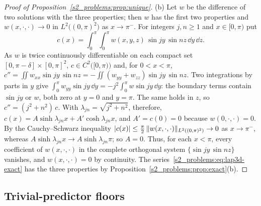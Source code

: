 \begin{proof}[Proof of Proposition~\ref{s2_problems:prop:unique}]
(b) Let $w$ be the difference of two solutions with the three properties; then $w$ has the
first two properties and $w(x,\cdot,\cdot)\to0$ in $L^2\bigl((0,\pi)^2\bigr)$ as
$x\to\pi^-$. For integers $j,n\ge1$ and $x\in[0,\pi)$ put
\[
c(x)=\int_0^\pi\!\!\int_0^\pi w(x,y,z)\,\sin jy\,\sin nz\,\dd y\,\dd z .
\]
As $w$ is twice continuously differentiable on each compact set
$[0,\pi-\delta]\times[0,\pi]^2$, $c\in C^2\bigl([0,\pi)\bigr)$ and, for $0<x<\pi$,
$c''=\iint w_{xx}\sin jy\,\sin nz=-\iint(w_{yy}+w_{zz})\sin jy\,\sin nz$. Two integrations
by parts in $y$ give
$\int_0^\pi w_{yy}\sin jy\,\dd y=-j^2\int_0^\pi w\sin jy\,\dd y$: the boundary terms
contain $\sin jy$ or $w$, both zero at $y=0$ and $y=\pi$. The same holds in $z$, so
$c''=(j^2+n^2)\,c$. With $\lambda_{jn}=\sqrt{j^2+n^2}$, therefore,
$c(x)=A\sinh\lambda_{jn}x+A'\cosh\lambda_{jn}x$, and $A'=c(0)=0$ because $w(0,\cdot,\cdot)=0$. By the
Cauchy--Schwarz inequality
$\lvert c(x)\rvert\le\tfrac\pi2\,\lVert w(x,\cdot,\cdot)\rVert_{L^2((0,\pi)^2)}\to0$ as $x\to\pi^-$,
whereas $A\sinh\lambda_{jn}x\to A\sinh\lambda_{jn}\pi$; so $A=0$. Thus, for each $x<\pi$, every
coefficient of $w(x,\cdot,\cdot)$ in the complete orthogonal system $\{\sin jy\,\sin nz\}$
vanishes, and $w(x,\cdot,\cdot)=0$ by continuity. The
series~\eqref{s2_problems:eq:lap3d-exact} has the three properties by
Proposition~\ref{s2_problems:prop:exact}(b).
\end{proof}

\subsection{Trivial-predictor floors}\label{sA_proofs:sec:floors}

